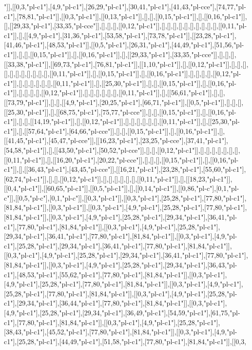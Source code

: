 "]],[[0,3,"pl-c1"],[4,9,"pl-c1"],[26,29,"pl-c1"],[30,41,"pl-c1"],[41,43,"pl-cce"],[74,77,"pl-c1"],[78,81,"pl-c1"]],[[0,3,"pl-c1"]],[[0,13,"pl-c1"]],[],[],[[0,15,"pl-c1"]],[],[[0,16,"pl-c1"]],[],[[29,33,"pl-c1"],[33,35,"pl-cce"]],[],[],[],[[0,12,"pl-c1"]],[],[],[],[],[],[],[],[],[],[],[[0,11,"pl-c1"]],[],[[4,9,"pl-c1"],[31,36,"pl-c1"],[53,58,"pl-c1"],[73,78,"pl-c1"]],[[23,28,"pl-c1"],[41,46,"pl-c1"],[48,53,"pl-c1"]],[[0,5,"pl-c1"],[26,31,"pl-c1"],[44,49,"pl-c1"],[51,56,"pl-c1"]],[],[],[[0,15,"pl-c1"]],[],[[0,16,"pl-c1"]],[],[[29,33,"pl-c1"],[33,35,"pl-cce"]],[],[],[],[[33,38,"pl-c1"]],[[69,73,"pl-c1"],[76,81,"pl-c1"]],[[1,10,"pl-c1"]],[],[[0,12,"pl-c1"]],[],[],[],[],[],[],[],[],[],[],[],[[0,11,"pl-c1"]],[],[[0,15,"pl-c1"]],[],[[0,16,"pl-c1"]],[],[],[],[],[[0,12,"pl-c1"]],[],[],[],[],[],[],[[0,11,"pl-c1"]],[],[[25,30,"pl-c1"]],[],[],[[0,15,"pl-c1"]],[],[[0,16,"pl-c1"]],[],[],[],[],[[0,12,"pl-c1"]],[],[],[],[],[],[],[[0,11,"pl-c1"]],[],[[56,61,"pl-c1"]],[],[],[[73,79,"pl-c1"]],[],[],[[4,9,"pl-c1"],[20,25,"pl-c1"],[66,71,"pl-c1"]],[[0,5,"pl-c1"]],[],[],[],[[25,30,"pl-c1"]],[],[[68,75,"pl-c1"],[75,77,"pl-cce"]],[],[],[[0,15,"pl-c1"]],[],[[0,16,"pl-c1"]],[],[],[[14,19,"pl-c1"]],[],[[0,12,"pl-c1"]],[],[],[],[],[],[],[[0,11,"pl-c1"]],[],[[25,30,"pl-c1"]],[],[[57,64,"pl-c1"],[64,66,"pl-cce"]],[],[],[[0,15,"pl-c1"]],[],[[0,16,"pl-c1"]],[],[[41,45,"pl-c1"],[45,47,"pl-cce"]],[[16,23,"pl-c1"],[23,25,"pl-cce"],[37,41,"pl-c1"],[54,58,"pl-c1"]],[],[[43,50,"pl-c1"],[50,52,"pl-cce"]],[],[],[[0,12,"pl-c1"]],[],[],[],[],[],[],[],[[0,11,"pl-c1"]],[],[[16,20,"pl-c1"],[20,22,"pl-cce"]],[],[],[],[[0,15,"pl-c1"]],[],[[0,16,"pl-c1"]],[],[[36,43,"pl-c1"],[43,45,"pl-cce"]],[[16,21,"pl-c1"],[23,28,"pl-c1"],[55,60,"pl-c1"],[62,74,"pl-c1"]],[],[],[[0,12,"pl-c1"]],[],[],[],[],[],[],[[0,11,"pl-c1"]],[],[[18,23,"pl-c1"]],[[0,4,"pl-c1"]],[[60,65,"pl-c1"]],[[0,5,"pl-c1"]],[],[[0,14,"pl-c1"]],[[0,86,"pl-c"],[0,1,"pl-c"]],[[0,5,"pl-c"],[0,1,"pl-c"]],[[0,3,"pl-c1"]],[[0,3,"pl-c1"],[25,28,"pl-c1"],[77,80,"pl-c1"],[81,84,"pl-c1"]],[[0,3,"pl-c1"]],[[0,3,"pl-c1"],[4,9,"pl-c1"],[25,28,"pl-c1"],[77,80,"pl-c1"],[81,84,"pl-c1"]],[[0,3,"pl-c1"],[4,9,"pl-c1"],[25,28,"pl-c1"],[29,34,"pl-c1"],[36,41,"pl-c1"],[77,80,"pl-c1"],[81,84,"pl-c1"]],[[0,3,"pl-c1"],[4,9,"pl-c1"],[25,28,"pl-c1"],[29,34,"pl-c1"],[36,41,"pl-c1"],[77,80,"pl-c1"],[81,84,"pl-c1"]],[[0,3,"pl-c1"],[4,9,"pl-c1"],[25,28,"pl-c1"],[29,34,"pl-c1"],[36,41,"pl-c1"],[77,80,"pl-c1"],[81,84,"pl-c1"]],[[0,3,"pl-c1"],[4,9,"pl-c1"],[25,28,"pl-c1"],[29,34,"pl-c1"],[36,41,"pl-c1"],[77,80,"pl-c1"],[81,84,"pl-c1"]],[[0,3,"pl-c1"],[4,9,"pl-c1"],[25,28,"pl-c1"],[29,34,"pl-c1"],[36,43,"pl-c1"],[48,53,"pl-c1"],[55,62,"pl-c1"],[77,80,"pl-c1"],[81,84,"pl-c1"]],[[0,3,"pl-c1"],[4,9,"pl-c1"],[25,28,"pl-c1"],[77,80,"pl-c1"],[81,84,"pl-c1"]],[[0,3,"pl-c1"],[4,9,"pl-c1"],[25,28,"pl-c1"],[77,80,"pl-c1"],[81,84,"pl-c1"]],[[0,3,"pl-c1"],[4,9,"pl-c1"],[25,28,"pl-c1"],[29,34,"pl-c1"],[36,44,"pl-c1"],[77,80,"pl-c1"],[81,84,"pl-c1"]],[[0,3,"pl-c1"],[4,9,"pl-c1"],[25,28,"pl-c1"],[29,34,"pl-c1"],[36,49,"pl-c1"],[54,59,"pl-c1"],[61,75,"pl-c1"],[77,80,"pl-c1"],[81,84,"pl-c1"]],[[0,3,"pl-c1"],[4,9,"pl-c1"],[25,28,"pl-c1"],[38,43,"pl-c1"],[45,52,"pl-c1"],[77,80,"pl-c1"],[81,84,"pl-c1"]],[[0,3,"pl-c1"],[4,9,"pl-c1"],[25,28,"pl-c1"],[44,49,"pl-c1"],[51,58,"pl-c1"],[77,80,"pl-c1"],[81,84,"pl-c1"]],[[0,3,